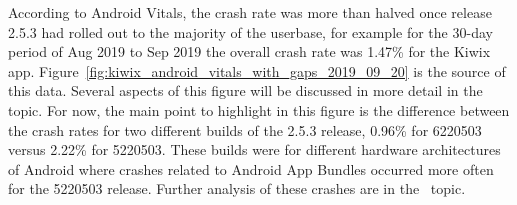 According to Android Vitals, the crash rate was more than halved once release 2.5.3 had rolled out to the majority of the userbase, for example for the 30-day period of  Aug 2019 to  Sep 2019 the overall crash rate was 1.47\% for the Kiwix app. Figure~\ref{fig:kiwix_android_vitals_with_gaps_2019_09_20} is the source of this data. Several aspects of this figure will be discussed in more detail in the \href{section-flaws-in-the-analytics}{} topic. For now, the main point to highlight in this figure is the difference between the crash rates for two different builds of the 2.5.3 release, 0.96\% for 6220503 versus 2.22\% for 5220503. These builds were for different hardware architectures of Android where crashes related to Android App Bundles occurred more often for the 5220503 release. Further analysis of these crashes are in the~\href{kiwix-android-app-bundling-crashes}{} topic.

